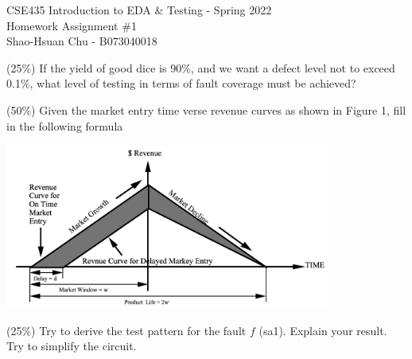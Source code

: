 \documentclass[12pt,answers]{exam}
\begin{document}
\begin{center}
\LARGE CSE435 Introduction to EDA \& Testing - Spring 2022 \\
\Large Homework Assignment \#1 \\
\Large Shao-Hsuan Chu - B073040018 \\
\end{center}
\bigskip

\begin{questions}
  \question (25\%) If the yield of good dice is 90\%, and we want a defect level not to exceed 0.1\%, what level of testing in terms of fault coverage must be achieved?
  \begin{solution}
  
  \end{solution}

  \question (50\%) Given the market entry time verse revenue curves as shown in Figure 1, fill in the following formula
  \begin{center}
  \includegraphics[width=0.8\textwidth]{assets/q2.png}
  \end{center}

  \question (25\%) Try to derive the test pattern for the fault $f$ (sa1). Explain your result. Try to simplify the circuit.

    
    \begin{solution}
    
    
    \end{solution}
\end{questions}
\end{document}

